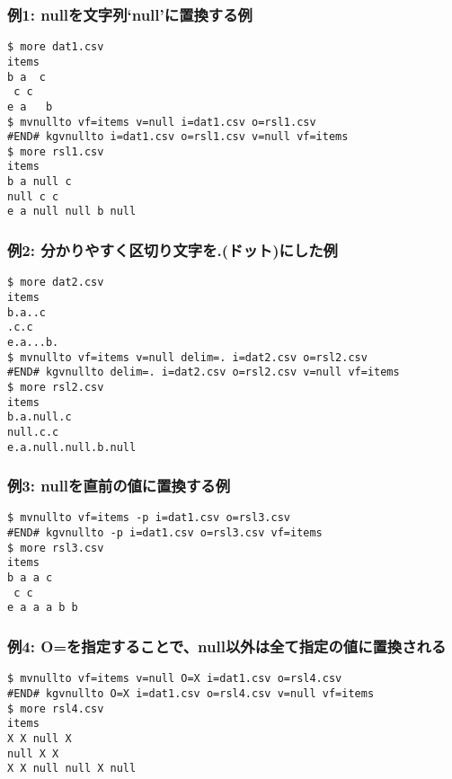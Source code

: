 \subsubsection*{例1: nullを文字列`null'に置換する例}



\begin{Verbatim}[baselinestretch=0.7,frame=single]
$ more dat1.csv
items
b a  c
 c c
e a   b 
$ mvnullto vf=items v=null i=dat1.csv o=rsl1.csv
#END# kgvnullto i=dat1.csv o=rsl1.csv v=null vf=items
$ more rsl1.csv
items
b a null c
null c c
e a null null b null
\end{Verbatim}
\subsubsection*{例2: 分かりやすく区切り文字を.(ドット)にした例}



\begin{Verbatim}[baselinestretch=0.7,frame=single]
$ more dat2.csv
items
b.a..c
.c.c
e.a...b.
$ mvnullto vf=items v=null delim=. i=dat2.csv o=rsl2.csv
#END# kgvnullto delim=. i=dat2.csv o=rsl2.csv v=null vf=items
$ more rsl2.csv
items
b.a.null.c
null.c.c
e.a.null.null.b.null
\end{Verbatim}
\subsubsection*{例3: nullを直前の値に置換する例}



\begin{Verbatim}[baselinestretch=0.7,frame=single]
$ mvnullto vf=items -p i=dat1.csv o=rsl3.csv
#END# kgvnullto -p i=dat1.csv o=rsl3.csv vf=items
$ more rsl3.csv
items
b a a c
 c c
e a a a b b
\end{Verbatim}
\subsubsection*{例4: O=を指定することで、null以外は全て指定の値に置換される}



\begin{Verbatim}[baselinestretch=0.7,frame=single]
$ mvnullto vf=items v=null O=X i=dat1.csv o=rsl4.csv
#END# kgvnullto O=X i=dat1.csv o=rsl4.csv v=null vf=items
$ more rsl4.csv
items
X X null X
null X X
X X null null X null
\end{Verbatim}
